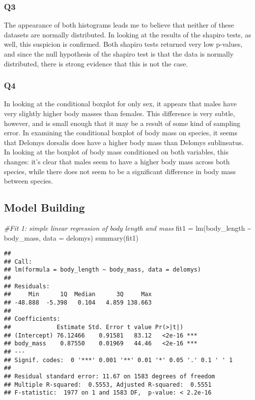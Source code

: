 \documentclass[
]{article}
\newenvironment{Shaded}{\begin{snugshade}}{\end{snugshade}}
\newcommand{\AttributeTok}[1]{\textcolor[rgb]{0.77,0.63,0.00}{#1}}
\newcommand{\CommentTok}[1]{\textcolor[rgb]{0.56,0.35,0.01}{\textit{#1}}}
\newcommand{\FunctionTok}[1]{\textcolor[rgb]{0.00,0.00,0.00}{#1}}
\newcommand{\NormalTok}[1]{#1}
\newcommand{\OtherTok}[1]{\textcolor[rgb]{0.56,0.35,0.01}{#1}}
\newcommand{\SpecialCharTok}[1]{\textcolor[rgb]{0.00,0.00,0.00}{#1}}
\begin{document}
\hypertarget{q3}{%
\subsubsection{Q3}\label{q3}}

The appearance of both histograms leads me to believe that neither of
these datasets are normally distributed. In looking at the results of
the shapiro tests, as well, this suspicion is confirmed. Both shapiro
tests returned very low p-values, and since the null hypothesis of the
shapiro test is that the data is normally distributed, there is strong
evidence that this is not the case.

\hypertarget{q4}{%
\subsubsection{Q4}\label{q4}}

In looking at the conditional boxplot for only sex, it appears that
males have very slightly higher body masses than females. This
difference is very subtle, however, and is small enough that it may be a
result of some kind of sampling error. In examining the conditional
boxplot of body mass on species, it seems that Delomys dorsalis does
have a higher body mass than Delomys sublineatus. In looking at the
boxplot of body mass conditioned on both variables, this changes: it's
clear that males seem to have a higher body mass across both species,
while there does not seem to be a significant difference in body mass
between species.

\hypertarget{model-building}{%
\subsection{Model Building}\label{model-building}}

\begin{Shaded}
\begin{Highlighting}[]
\CommentTok{\#Fit 1: simple linear regression of body length and mass}
\NormalTok{fit1 }\OtherTok{=} \FunctionTok{lm}\NormalTok{(body\_length }\SpecialCharTok{\textasciitilde{}}\NormalTok{ body\_mass, }\AttributeTok{data =}\NormalTok{ delomys)}
\FunctionTok{summary}\NormalTok{(fit1)}
\end{Highlighting}
\end{Shaded}

\begin{verbatim}
## 
## Call:
## lm(formula = body_length ~ body_mass, data = delomys)
## 
## Residuals:
##     Min      1Q  Median      3Q     Max 
## -48.888  -5.398   0.104   4.859 138.663 
## 
## Coefficients:
##             Estimate Std. Error t value Pr(>|t|)    
## (Intercept) 76.12466    0.91581   83.12   <2e-16 ***
## body_mass    0.87550    0.01969   44.46   <2e-16 ***
## ---
## Signif. codes:  0 '***' 0.001 '**' 0.01 '*' 0.05 '.' 0.1 ' ' 1
## 
## Residual standard error: 11.67 on 1583 degrees of freedom
## Multiple R-squared:  0.5553, Adjusted R-squared:  0.5551 
## F-statistic:  1977 on 1 and 1583 DF,  p-value: < 2.2e-16
\end{verbatim}
\end{document}
